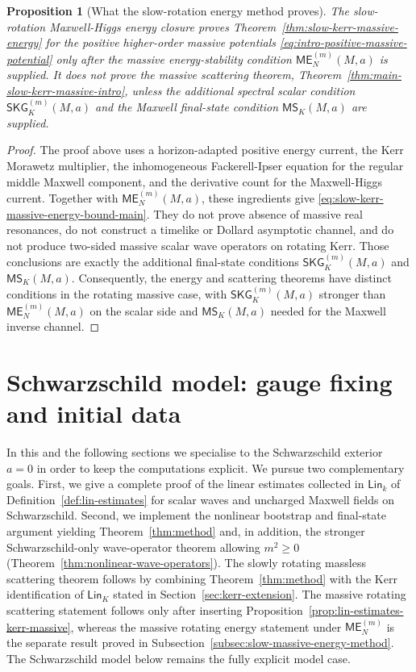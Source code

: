 \documentclass[11pt]{article}
\numberwithin{equation}{section}
\theoremstyle{plain}
\newtheorem{proposition}[theorem]{Proposition}
\theoremstyle{definition}
\theoremstyle{remark}
\newcommand{\Lin}{\mathsf{Lin}}
\newcommand{\SKG}{\mathsf{SKG}}
\newcommand{\ME}{\mathsf{ME}}
\newcommand{\MScat}{\mathsf{MS}}
\begin{document}
\begin{proposition}[What the slow-rotation energy method proves]\label{prop:slow-energy-method-massive-scope}
The slow-rotation Maxwell-Higgs energy closure proves Theorem~\ref{thm:slow-kerr-massive-energy} for the positive higher-order massive potentials \eqref{eq:intro-positive-massive-potential} only after the massive energy-stability condition \(\ME^{(m)}_N(M,a)\) is supplied.  It does not prove the massive scattering theorem, Theorem~\ref{thm:main-slow-kerr-massive-intro}, unless the additional spectral scalar condition \(\SKG^{(m)}_K(M,a)\) and the Maxwell final-state condition \(\MScat_K(M,a)\) are supplied.
\end{proposition}

\begin{proof}
The proof above uses a horizon-adapted positive energy current, the Kerr Morawetz multiplier, the inhomogeneous Fackerell-Ipser equation for the regular middle Maxwell component, and the derivative count for the Maxwell-Higgs current.  Together with \(\ME^{(m)}_N(M,a)\), these ingredients give \eqref{eq:slow-kerr-massive-energy-bound-main}.  They do not prove absence of massive real resonances, do not construct a timelike or Dollard asymptotic channel, and do not produce two-sided massive scalar wave operators on rotating Kerr.  Those conclusions are exactly the additional final-state conditions \(\SKG^{(m)}_K(M,a)\) and \(\MScat_K(M,a)\).  Consequently, the energy and scattering theorems have distinct conditions in the rotating massive case, with \(\SKG^{(m)}_K(M,a)\) stronger than \(\ME^{(m)}_N(M,a)\) on the scalar side and \(\MScat_K(M,a)\) needed for the Maxwell inverse channel.
\end{proof}

\section{Schwarzschild model: gauge fixing and initial data}\label{sec:setup}

In this and the following sections we specialise to the Schwarzschild exterior $a=0$ in order to keep the computations explicit.
We pursue two complementary goals.
First, we give a complete proof of the linear estimates collected in $\Lin_{k}$ of Definition~\ref{def:lin-estimates} for scalar waves and uncharged Maxwell fields on Schwarzschild.
Second, we implement the nonlinear bootstrap and final-state argument yielding Theorem~\ref{thm:method} and, in addition, the stronger Schwarzschild-only wave-operator theorem allowing $m^{2}\ge0$ (Theorem~\ref{thm:nonlinear-wave-operators}).
The slowly rotating massless scattering theorem follows by combining Theorem~\ref{thm:method} with the Kerr identification of $\Lin_{K}$ stated in Section~\ref{sec:kerr-extension}.  The massive rotating scattering statement follows only after inserting Proposition~\ref{prop:lin-estimates-kerr-massive}, whereas the massive rotating energy statement under \(\ME^{(m)}_N\) is the separate result proved in Subsection~\ref{subsec:slow-massive-energy-method}.  The Schwarzschild model below remains the fully explicit model case.
\end{document}
